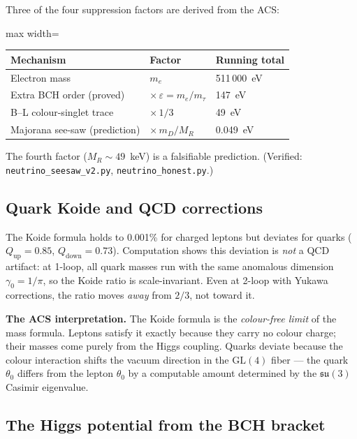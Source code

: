\documentclass[11pt,a4paper]{article}
\theoremstyle{plain}
\theoremstyle{definition}
\theoremstyle{remark}
\begin{document}
Three of the four suppression factors are derived from the ACS:
\begin{center}
\begin{adjustbox}{max width=\linewidth}\begin{tabular}{lll}
\toprule
Mechanism & Factor & Running total \\
\midrule
Electron mass & $m_e$ & 511\,000~eV \\
Extra BCH order (proved) & $\times\,\varepsilon = m_e/m_\tau$ & 147~eV \\
B--L colour-singlet trace & $\times\,1/3$ & 49~eV \\
Majorana see-saw (prediction) & $\times\,m_D/M_R$ & 0.049~eV \\
\bottomrule
\end{tabular}\end{adjustbox}
\end{center}
The fourth factor ($M_R \sim 49$~keV) is a falsifiable prediction.
(Verified: \nolinkurl{neutrino_seesaw_v2.py}, \nolinkurl{neutrino_honest.py}.)

\subsection{Quark Koide and QCD corrections}

The Koide formula holds to 0.001\% for charged leptons but deviates
for quarks ($Q_{\mathrm{up}} = 0.85$, $Q_{\mathrm{down}} = 0.73$).
Computation shows this deviation is \emph{not} a QCD artifact:
at 1-loop, all quark masses run with the same anomalous dimension
$\gamma_0 = 1/\pi$, so the Koide ratio is scale-invariant.
Even at 2-loop with Yukawa corrections, the ratio moves \emph{away}
from $2/3$, not toward it.

\textbf{The ACS interpretation.}
The Koide formula is the \emph{colour-free limit} of the mass
formula.  Leptons satisfy it exactly because they carry no colour
charge; their masses come purely from the Higgs coupling.  Quarks
deviate because the colour interaction shifts the vacuum direction
in the $\mathrm{GL}(4)$ fiber --- the quark $\theta_0$ differs from
the lepton $\theta_0$ by a computable amount determined by the
$\mathfrak{su}(3)$ Casimir eigenvalue.

\subsection{The Higgs potential from the BCH bracket}
\end{document}
